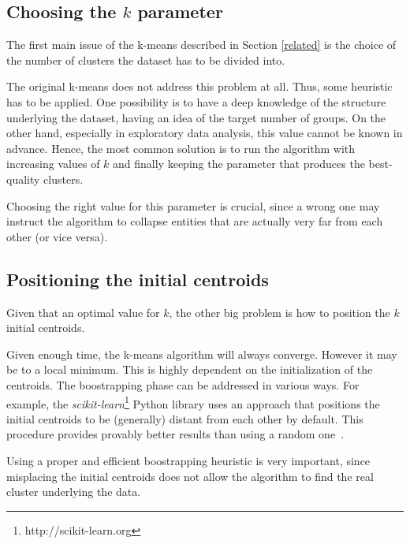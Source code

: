 \subsection*{Choosing the $k$ parameter}
The first main issue of the k-means described in Section \ref{related} is the choice
of the number of clusters the dataset has to be divided into.

The original k-means does not address this problem at all. Thus, some heuristic has to
be applied. One possibility is to have a deep knowledge of the structure underlying the
dataset, having an idea of the target number of groups. On the other hand, especially 
in exploratory data analysis, this value cannot be known in advance.
Hence, the most common solution is to run the algorithm with increasing values of $k$ and
finally keeping the parameter that produces the best-quality clusters.

Choosing the right value for this parameter is crucial, since a wrong one may
instruct the algorithm to collapse entities that are actually very far from each other
(or vice versa).


\subsection*{Positioning the initial centroids}
Given that an optimal value for $k$, the other big problem is how to position the $k$ 
initial centroids.

Given enough time, the k-means algorithm will always converge. However it may be to a local 
minimum. This is highly dependent on the initialization of the centroids. The boostrapping
phase can be addressed in various ways. For example, the 
\emph{scikit-learn}\footnote{http://scikit-learn.org} Python library 
uses an approach that positions the initial centroids to be (generally) distant
from each other by default. This procedure provides provably better results than using a random 
one~\cite{arthur2007k}.

Using a proper and efficient boostrapping heuristic is very important, since misplacing 
the initial centroids does not allow the algorithm to find the real cluster underlying
the data.
